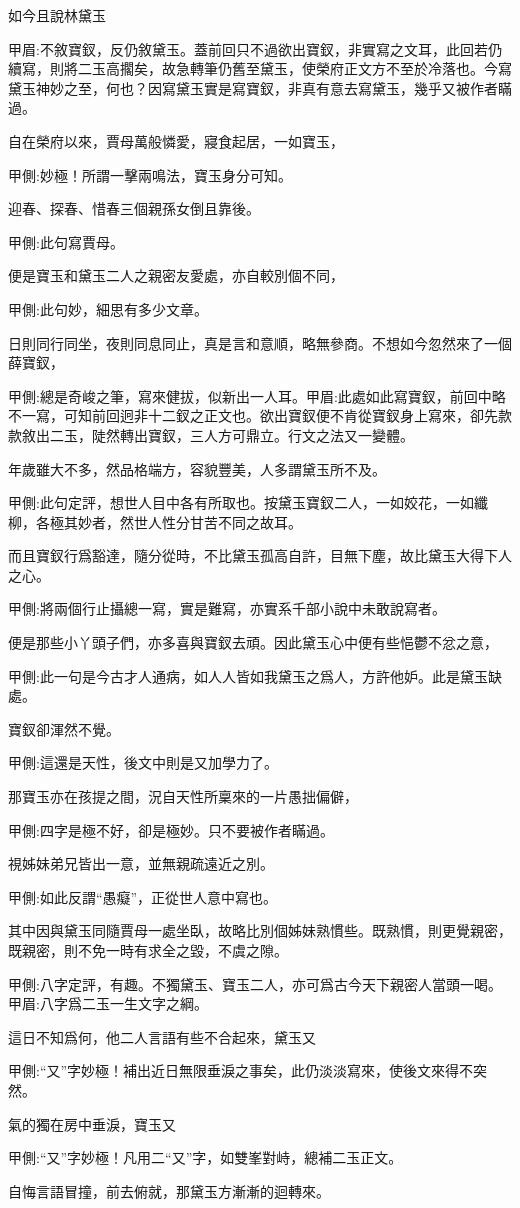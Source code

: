 \begin{parag}
    如今且說林黛玉\begin{note}甲眉:不敘寶釵，反仍敘黛玉。蓋前回只不過欲出寶釵，非實寫之文耳，此回若仍續寫，則將二玉高擱矣，故急轉筆仍舊至黛玉，使榮府正文方不至於冷落也。今寫黛玉神妙之至，何也？因寫黛玉實是寫寶釵，非真有意去寫黛玉，幾乎又被作者瞞過。\end{note}自在榮府以來，賈母萬般憐愛，寢食起居，一如寶玉，\begin{note}甲側:妙極！所謂一擊兩鳴法，寶玉身分可知。\end{note}迎春、探春、惜春三個親孫女倒且靠後。\begin{note}甲側:此句寫賈母。\end{note}便是寶玉和黛玉二人之親密友愛處，亦自較別個不同，\begin{note}甲側:此句妙，細思有多少文章。\end{note}日則同行同坐，夜則同息同止，真是言和意順，略無參商。不想如今忽然來了一個薛寶釵，\begin{note}甲側:總是奇峻之筆，寫來健拔，似新出一人耳。甲眉:此處如此寫寶釵，前回中略不一寫，可知前回迥非十二釵之正文也。欲出寶釵便不肯從寶釵身上寫來，卻先款款敘出二玉，陡然轉出寶釵，三人方可鼎立。行文之法又一變體。\end{note}年歲雖大不多，然品格端方，容貌豐美，人多謂黛玉所不及。\begin{note}甲側:此句定評，想世人目中各有所取也。按黛玉寶釵二人，一如姣花，一如纖柳，各極其妙者，然世人性分甘苦不同之故耳。\end{note}而且寶釵行爲豁達，隨分從時，不比黛玉孤高自許，目無下塵，故比黛玉大得下人之心。\begin{note}甲側:將兩個行止攝總一寫，實是難寫，亦實系千部小說中未敢說寫者。\end{note}便是那些小丫頭子們，亦多喜與寶釵去頑。因此黛玉心中便有些悒鬱不忿之意，\begin{note}甲側:此一句是今古才人通病，如人人皆如我黛玉之爲人，方許他妒。此是黛玉缺處。\end{note}寶釵卻渾然不覺。\begin{note}甲側:這還是天性，後文中則是又加學力了。\end{note}那寶玉亦在孩提之間，況自天性所稟來的一片愚拙偏僻，\begin{note}甲側:四字是極不好，卻是極妙。只不要被作者瞞過。\end{note}視姊妹弟兄皆出一意，並無親疏遠近之別。\begin{note}甲側:如此反謂“愚癡”，正從世人意中寫也。\end{note}其中因與黛玉同隨賈母一處坐臥，故略比別個姊妹熟慣些。既熟慣，則更覺親密，既親密，則不免一時有求全之毀，不虞之隙。\begin{note}甲側:八字定評，有趣。不獨黛玉、寶玉二人，亦可爲古今天下親密人當頭一喝。甲眉:八字爲二玉一生文字之綱。\end{note}這日不知爲何，他二人言語有些不合起來，黛玉又\begin{note}甲側:“又”字妙極！補出近日無限垂淚之事矣，此仍淡淡寫來，使後文來得不突然。\end{note}氣的獨在房中垂淚，寶玉又\begin{note}甲側:“又”字妙極！凡用二“又”字，如雙峯對峙，總補二玉正文。\end{note}自悔言語冒撞，前去俯就，那黛玉方漸漸的迴轉來。

\end{parag}
